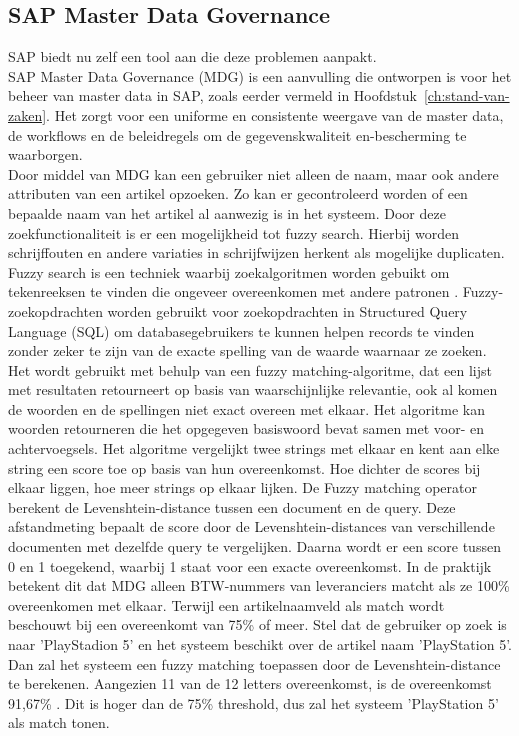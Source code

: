 \subsection{SAP Master Data Governance}
SAP biedt nu zelf een tool aan die deze problemen aanpakt. 
\\SAP Master Data Governance (MDG) is een aanvulling die ontworpen is voor het beheer van master data in SAP, zoals eerder vermeld in Hoofdstuk~\ref{ch:stand-van-zaken}. Het zorgt voor een uniforme en consistente weergave van de master data, de workflows en de beleidregels om de gegevenskwaliteit en-bescherming te waarborgen. 
\\Door middel van MDG kan een gebruiker niet alleen de naam, maar ook andere attributen van een artikel opzoeken. Zo kan er gecontroleerd worden of een bepaalde naam van het artikel al aanwezig is in het systeem. Door deze zoekfunctionaliteit is er een mogelijkheid tot fuzzy search. Hierbij worden schrijffouten en andere variaties in schrijfwijzen herkent als mogelijke duplicaten. 
\\Fuzzy search is een techniek waarbij zoekalgoritmen worden gebuikt om tekenreeksen te vinden die ongeveer overeenkomen met andere patronen \autocite{TechTarget2022}. Fuzzy-zoekopdrachten worden gebruikt voor zoekopdrachten in Structured Query Language (SQL) om databasegebruikers te kunnen helpen records te vinden zonder zeker te zijn van de exacte spelling van de waarde waarnaar ze zoeken. Het wordt gebruikt met behulp van een fuzzy matching-algoritme, dat een lijst met resultaten retourneert op basis van waarschijnlijke relevantie, ook al komen de woorden en de spellingen niet exact overeen met elkaar. Het algoritme kan woorden retourneren die het opgegeven basiswoord bevat samen met voor- en achtervoegsels. Het algoritme vergelijkt twee strings met elkaar en kent aan elke string een score toe op basis van hun overeenkomst. Hoe dichter de scores bij elkaar liggen, hoe meer strings op elkaar lijken. De Fuzzy matching operator berekent de Levenshtein-distance tussen een document en de query. Deze afstandmeting bepaalt de score door de Levenshtein-distances van verschillende documenten met dezelfde query te vergelijken. Daarna wordt er een score tussen 0 en 1 toegekend, waarbij 1 staat voor een exacte overeenkomst. In de praktijk betekent dit dat MDG alleen BTW-nummers van leveranciers matcht als ze 100\% overeenkomen met elkaar. Terwijl een artikelnaamveld als match wordt beschouwt bij een overeenkomt van 75\% of meer. Stel dat de gebruiker op zoek is naar 'PlayStadion 5' en het systeem beschikt over de artikel naam 'PlayStation 5'. Dan zal het systeem een fuzzy matching toepassen door de Levenshtein-distance te berekenen. Aangezien 11 van de 12 letters overeenkomst, is de overeenkomst 91,67\% \autocite{IBM}. Dit is hoger dan de 75\% threshold, dus zal het systeem 'PlayStation 5' als match tonen.

